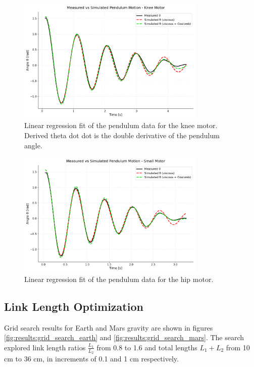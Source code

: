 \begin{figure}[H]
    \centering
    \includegraphics[width=0.8\textwidth]{Images/results/pendulum_large.png}
    \caption{Linear regression fit of the pendulum data for the knee motor. Derived theta dot dot is the double derivative of the pendulum angle.}
    \label{fig:results:motor_friction_estimation:pendulum_large}
\end{figure}

\begin{figure}[H]
    \centering
    \includegraphics[width=0.8\textwidth]{Images/results/pendulum_small.png}
    \caption{Linear regression fit of the pendulum data for the hip motor.}
    \label{fig:results:motor_friction_estimation:pendulum_small}
\end{figure}




\subsection{Link Length Optimization}
\label{sec:results:link_length_optimization}
Grid search results for Earth and Mars gravity are shown in figures \ref{fig:results:grid_search_earth} and \ref{fig:results:grid_search_mars}. The search explored link length ratios \(\frac{L_1}{L_2}\) from 0.8 to 1.6 and total lengths \(L_1 + L_2\) from 10 cm to 36 cm, in increments of 0.1 and 1 cm respectively.


